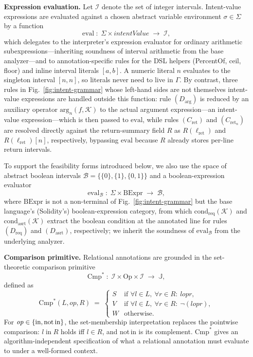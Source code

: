\documentclass[pdflatex,sn-basic]{sn-jnl}%
\theoremstyle{thmstyleone}%
\theoremstyle{thmstyletwo}%
\theoremstyle{thmstylethree}%
\begin{document}
\smallskip
\noindent\textbf{Expression evaluation.}
Let $\mathcal{I}$ denote the set of integer intervals.
Intent-value expressions are evaluated against a chosen abstract variable environment $\sigma \in \Sigma$ by a function
\[
\text{eval} \;:\; \Sigma \times \mathit{intentValue} \;\to\; \mathcal{I},
\]
which delegates to the interpreter's expression evaluator for ordinary arithmetic subexpressions---inheriting soundness of interval arithmetic from the base analyzer---and to annotation-specific rules for the DSL helpers (PercentOf, ceil, floor) and inline interval literals $[a, b]$.
A numeric literal $n$ evaluates to the singleton interval $[n, n]$, so literals never need to live in $\Gamma$.
By contrast, three rules in Fig.~\ref{fig:intent-grammar} whose left-hand sides are not themselves intent-value expressions are handled outside this function: rule $(D_{\text{arg}})$ is reduced by an auxiliary operator $\text{arg}_n(f, \mathcal{K})$ to the actual argument expression---an intent-value expression---which is then passed to $\text{eval}$, while rules $(C_{\text{ret}})$ and $(C_{\text{ret}_n})$ are resolved directly against the return-summary field $R$ as $R(\ell_{\text{ret}})$ and $R(\ell_{\text{ret}})[n]$, respectively, bypassing $\text{eval}$ because $R$ already stores per-line return intervals.

To support the feasibility forms introduced below, we also use the space of abstract boolean intervals $\mathcal{B} = \{\{0\}, \{1\}, \{0, 1\}\}$ and a boolean-expression evaluator
\[
\text{eval}_{\mathcal{B}} \;:\; \Sigma \times \text{BExpr} \;\to\; \mathcal{B},
\]
where $\text{BExpr}$ is not a non-terminal of Fig.~\ref{fig:intent-grammar} but the base language's (Solidity's) boolean-expression category, from which $\text{cond}_{\text{req}}(\mathcal{K})$ and $\text{cond}_{\text{asrt}}(\mathcal{K})$ extract the boolean condition at the annotated line for rules $(D_{\text{req}})$ and $(D_{\text{asrt}})$, respectively; we inherit the soundness of $\text{eval}_{\mathcal{B}}$ from the underlying analyzer.

\smallskip
\noindent\textbf{Comparison primitive.}
Relational annotations are grounded in the set-theoretic comparison primitive
\[
\text{Cmp}^* \;:\; \mathcal{I} \times \text{Op} \times \mathcal{I} \;\to\; \mathbb{J},
\]
defined as
\[
\text{Cmp}^*(L, \mathit{op}, R) \;=\;
\begin{cases}
S & \text{if } \forall l \in L,\ \forall r \in R :\ l \mathrel{\mathit{op}} r, \\[2pt]
V & \text{if } \forall l \in L,\ \forall r \in R :\ \neg(l \mathrel{\mathit{op}} r), \\[2pt]
W & \text{otherwise.}
\end{cases}
\]
For $\mathit{op} \in \{\text{in}, \text{not\,in}\}$, the set-membership interpretation replaces the pointwise comparison: $l \mathrel{\text{in}} R$ holds iff $l \in R$, and not\,in is its complement.
$\text{Cmp}^*$ gives an algorithm-independent specification of what a relational annotation must evaluate to under a well-formed context.
\end{document}
